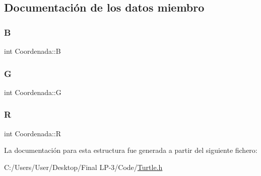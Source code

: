 \subsection{Documentación de los datos miembro}
\mbox{\label{struct_coordenada_a621f1a40b6c15b276f3c0c7beb2ef2d5}} 
\subsubsection{\texorpdfstring{B}{B}}
{\footnotesize\ttfamily int Coordenada\+::B}

\mbox{\label{struct_coordenada_ae75df3b2848c88c3a4a0de5547a3f1b6}} 
\subsubsection{\texorpdfstring{G}{G}}
{\footnotesize\ttfamily int Coordenada\+::G}

\mbox{\label{struct_coordenada_a9b9f46aaf2177a9ea2c295f8e2c86973}} 
\subsubsection{\texorpdfstring{R}{R}}
{\footnotesize\ttfamily int Coordenada\+::R}



La documentación para esta estructura fue generada a partir del siguiente fichero\+:\begin{DoxyCompactItemize}
\item 
C\+:/\+Users/\+User/\+Desktop/\+Final L\+P-\/3/\+Code/\mbox{\hyperlink{_turtle_8h}{Turtle.\+h}}\end{DoxyCompactItemize}
